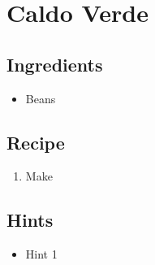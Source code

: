 \section{Caldo Verde}
\subsection*{Ingredients}
\begin{itemize}
    \item Beans
\end{itemize}

\subsection*{Recipe}
\begin{enumerate}
    \item Make
\end{enumerate}

\subsection*{Hints}
\begin{itemize}
    \item Hint 1
\end{itemize}
\newpage
